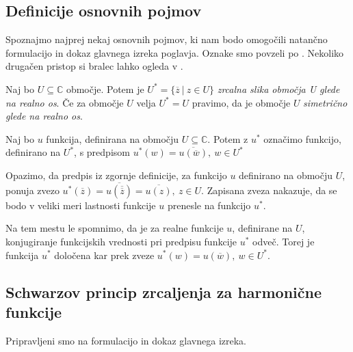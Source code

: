 \documentclass[mat1, tisk]{fmfdelo}
\begin{document}
\subsection{Definicije osnovnih pojmov}

    Spoznajmo najprej nekaj osnovnih pojmov, ki nam bodo omogočili natančno formulacijo in dokaz glavnega izreka poglavja. Oznake smo povzeli po \cite{mckernan}. 
    Nekoliko drugačen pristop si bralec lahko ogleda v \cite[strani 67-71]{hft}.
    \begin{definicija}
        Naj bo $U \subseteq \mathbb{C}$ območje. Potem je $U^* = \{\overline{z}~|~z \in U\}$ \emph{zrcalna slika območja U glede na realno os}.
        Če za območje $U$ velja $U^* = U$ pravimo, da je območje $U$ \emph{simetrično glede na realno os}.
    \end{definicija}

    \begin{definicija}
        Naj bo $u$ funkcija, definirana na območju $U \subseteq \mathbb{C}$. Potem z \emph{$u^*$} označimo funkcijo, definirano na $U^*$, s predpisom $u^*(w) = \overline{u(\overline{w})},~w \in U^*$
    \end{definicija}

    Opazimo, da predpis iz zgornje definicije, za funkcijo $u$ definirano na območju $U$, ponuja zvezo $u^*(\overline{z}) = \overline{u(\overline{\overline{z}})} = \overline{u(z)},~z \in U$.
    Zapisana zveza nakazuje, da se bodo v veliki meri lastnosti funkcije $u$ prenesle na funkcijo $u^*$.

    \begin{opomba}
        Na tem mestu le spomnimo, da je za realne funkcije $u$, definirane na $U$, konjugiranje funkcijskih vrednosti pri predpisu funkcije $u^*$ odveč. Torej je funkcija $u^*$ določena kar prek zveze $u^*(w) = u(\overline{w}),~w \in U^*$.
    \end{opomba}

\subsection{Schwarzov princip zrcaljenja za harmonične funkcije}

    Pripravljeni smo na formulacijo in dokaz glavnega izreka. 
\end{document}

